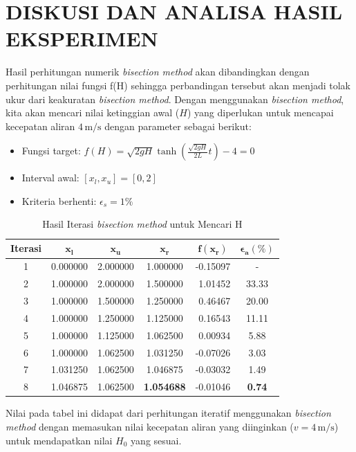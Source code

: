 \documentclass[conference]{IEEEtran}
\begin{document}
\section{DISKUSI DAN ANALISA HASIL EKSPERIMEN}
Hasil perhitungan numerik \textit{bisection method} akan dibandingkan dengan perhitungan nilai fungsi f(H) sehingga perbandingan tersebut akan menjadi tolak ukur dari keakuratan \textit{bisection method}. Dengan menggunakan \textit{bisection method}, kita akan mencari nilai ketinggian awal ($H$) yang diperlukan untuk mencapai kecepatan aliran $4 \, \text{m/s}$ dengan parameter sebagai berikut:
\begin{itemize}
    \item Fungsi target: $f(H) = \sqrt{2gH} \tanh\left(\frac{\sqrt{2gH}}{2L}t\right) - 4 = 0$
    \item Interval awal: $[x_l, x_u] = [0, 2]$
    \item Kriteria berhenti: $\epsilon_s = 1\%$
\end{itemize}
\begin{table}[htbp]
\centering
\caption{Hasil Iterasi \textit{bisection method} untuk Mencari H}
\label{tab:hasil_bisection}
\renewcommand{\arraystretch}{1.2}
\begin{tabular}{|c|c|c|c|r|c|}
\hline
\textbf{Iterasi} & $\boldsymbol{x_l}$ & $\boldsymbol{x_u}$ & $\boldsymbol{x_r}$ & \multicolumn{1}{c|}{$\boldsymbol{f(x_r)}$} & $\boldsymbol{\epsilon_a (\%)}$ \\
\hline
1 & 0.000000 & 2.000000 & 1.000000 & -0.15097 & - \\
2 & 1.000000 & 2.000000 & 1.500000 & 1.01452 & 33.33 \\
3 & 1.000000 & 1.500000 & 1.250000 & 0.46467 & 20.00 \\
4 & 1.000000 & 1.250000 & 1.125000 & 0.16543 & 11.11 \\
5 & 1.000000 & 1.125000 & 1.062500 & 0.00934 & 5.88  \\
6 & 1.000000 & 1.062500 & 1.031250 & -0.07026 & 3.03  \\
7 & 1.031250 & 1.062500 & 1.046875 & -0.03032 & 1.49  \\
8 & 1.046875 & 1.062500 & \textbf{1.054688} & -0.01046 & \textbf{0.74} \\
\hline
\end{tabular}
\end{table}
Nilai pada tabel ini didapat dari perhitungan iteratif menggunakan \textit{bisection method} dengan memasukan nilai kecepatan aliran yang diinginkan ($v = 4 \, \text{m/s}$) untuk mendapatkan nilai $H_0$ yang sesuai.
\end{document}
